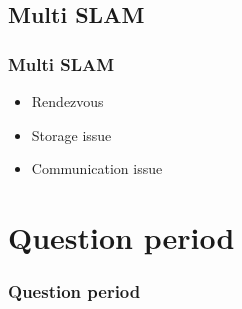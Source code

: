 \documentclass{beamerthesis}
\begin{document}
\subsection{Multi SLAM}
\begin{frame}\frametitle{Multi SLAM}
	\begin{itemize}
		\item Rendezvous
		\item Storage issue
		\item Communication issue
	\end{itemize}
\end{frame}

\section{Question period}
{
\begin{frame}
\frametitle{Question period}
	\pause
\end{frame}}
\end{document}
